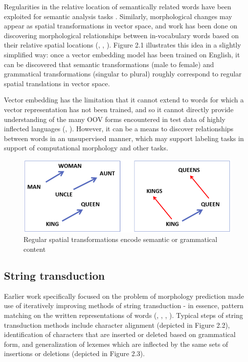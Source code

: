 Regularities in the relative location of semantically related words have been exploited for semantic analysis tasks \parencite{Alexandrescu2006}. Similarly, morphological changes may appear as spatial transformations in vector space, and work has been done on discovering morphological relationships between in-vocabulary words based on their relative spatial locations (\cite{Mikolov2013}, \cite{Soricut2015}, \cite{DosSantos2014}). Figure 2.1 illustrates this idea in a slightly simplified way: once a vector embedding model has been trained on English, it can be discovered that semantic transformations (male to female) and grammatical transformations (singular to plural) roughly correspond to regular spatial translations in vector space.

Vector embedding has the limitation that it cannot extend to words for which a vector representation has not been trained, and so it cannot directly provide understanding of the many OOV forms encountered in test data of highly inflected languages (\cite{Soricut2015}, \cite{Cotterell2019}). However, it can be a means to discover relationships between words in an unsupervised manner, which may support labeling tasks in support of computational morphology and other tasks.

\begin{figure}[ht]
\includegraphics[width=12cm]{images/semantic_transform.png}
\centering
\caption{Regular spatial transformations encode semantic or grammatical content \parencite{Mikolov2013}}
\end{figure}

\subsection{String transduction}

Earlier work specifically focused on the problem of morphology prediction made use of iteratively improving methods of string transduction - in essence, pattern matching on the written representations of words (\cite{Durrett2013}, \cite{Hulden2014}, \cite{Nicolai2015}, \cite{Ahlberg2015}). Typical steps of string transduction methods include character alignment (depicted in Figure 2.2), identification of characters that are inserted or deleted based on grammatical form, and generalization of lexemes which are inflected by the same sets of insertions or deletions (depicted in Figure 2.3). 

